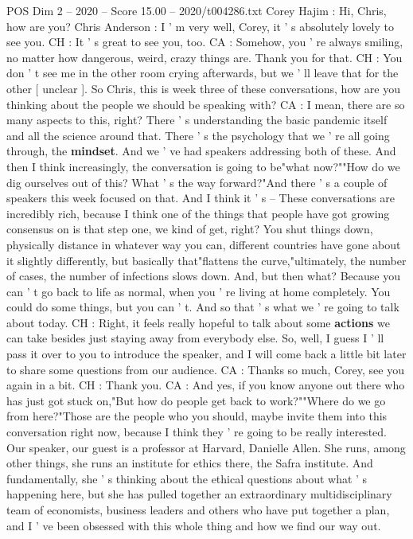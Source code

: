 \begin{textsample}{POS Dim 2 – 2020 – Score 15.00 – 2020/t004286.txt}  \label{ex:f2_pos_017}
Corey Hajim : Hi, Chris, how are you?
Chris Anderson : I ' m very well, Corey, it ' s absolutely lovely to see you.
CH : It ' s great to see you, too.
CA : Somehow, you ' re always smiling, no matter how dangerous, weird, crazy things are.
Thank you for that.
CH : You don ' t see me in the other room crying afterwards, but we ' ll leave that for the other [ unclear ].
So Chris, this is week three of these conversations, how are you thinking about the people we should be speaking with?
CA : I mean, there are so many aspects to this, right?
There ' s understanding the basic pandemic itself and all the science around that.
There ' s the psychology that we ' re all going through, the \textbf{mindset}.
And we ' ve had speakers addressing both of these.
And then I think increasingly, the conversation is going to be"what now?""How do we dig ourselves out of this?
What ' s the way forward?"And there ' s a couple of speakers this week focused on that.
And I think it ' s -- These conversations are incredibly rich, because I think one of the things that people have got growing consensus on is that step one, we kind of get, right?
You shut things down, physically distance in whatever way you can, different countries have gone about it slightly differently, but basically that"flattens the curve,"ultimately, the number of cases, the number of infections slows down.
And, but then what?
Because you can ' t go back to life as normal, when you ' re living at home completely.
You could do some things, but you can ' t.
And so that ' s what we ' re going to talk about today.
CH : Right, it feels really hopeful to talk about some \textbf{actions} we can take besides just staying away from everybody else.
So, well, I guess I ' ll pass it over to you to introduce the speaker, and I will come back a little bit later to share some questions from our audience.
CA : Thanks so much, Corey, see you again in a bit.
CH : Thank you.
CA : And yes, if you know anyone out there who has just got stuck on,"But how do people get back to work?""Where do we go from here?"Those are the people who you should, maybe invite them into this conversation right now, because I think they ' re going to be really interested.
Our speaker, our guest is a professor at Harvard, Danielle Allen.
She runs, among other things, she runs an institute for ethics there, the Safra institute.
And fundamentally, she ' s thinking about the ethical questions about what ' s happening here, but she has pulled together an extraordinary multidisciplinary team of economists, business leaders and others who have put together a plan, and I ' ve been obsessed with this whole thing and how we find our way out.

\end{textsample}

